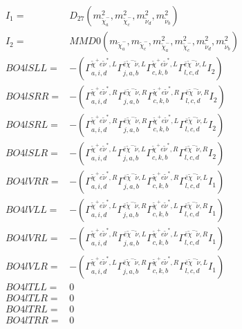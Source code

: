 \documentclass[A4,landscape]{article}
\begin{document}
\begin{align} 
I_1 = & D_{27}(m^2_{\tilde{\chi}^-_{{a}}}, m^2_{\tilde{\chi}^-_{{c}}}, m^2_{\tilde{\nu}_{{d}}}, m^2_{\tilde{\nu}_{{b}}}) \\ 
I_2 = & MMD0(m_{\tilde{\chi}^-_{{a}}}, m_{\tilde{\chi}^-_{{c}}}, m^2_{\tilde{\chi}^-_{{a}}}, m^2_{\tilde{\chi}^-_{{c}}}, m^2_{\tilde{\nu}_{{d}}}, m^2_{\tilde{\nu}_{{b}}}) \\ 
  BO4lSLL= & -( \Gamma^{\tilde{\chi}^+e \tilde{\nu}^*,L}_{a, i, d} \Gamma^{\bar{e}\tilde{\chi}^- \tilde{\nu} ,L}_{j, a, b} \Gamma^{\tilde{\chi}^+e \tilde{\nu}^*,L}_{c, k, b} \Gamma^{\bar{e}\tilde{\chi}^- \tilde{\nu} ,L}_{l, c, d} I_2) \\ 
  BO4lSRR= & -( \Gamma^{\tilde{\chi}^+e \tilde{\nu}^*,R}_{a, i, d} \Gamma^{\bar{e}\tilde{\chi}^- \tilde{\nu} ,R}_{j, a, b} \Gamma^{\tilde{\chi}^+e \tilde{\nu}^*,R}_{c, k, b} \Gamma^{\bar{e}\tilde{\chi}^- \tilde{\nu} ,R}_{l, c, d} I_2) \\ 
  BO4lSRL= & -( \Gamma^{\tilde{\chi}^+e \tilde{\nu}^*,R}_{a, i, d} \Gamma^{\bar{e}\tilde{\chi}^- \tilde{\nu} ,R}_{j, a, b} \Gamma^{\tilde{\chi}^+e \tilde{\nu}^*,L}_{c, k, b} \Gamma^{\bar{e}\tilde{\chi}^- \tilde{\nu} ,L}_{l, c, d} I_2) \\ 
  BO4lSLR= & -( \Gamma^{\tilde{\chi}^+e \tilde{\nu}^*,L}_{a, i, d} \Gamma^{\bar{e}\tilde{\chi}^- \tilde{\nu} ,L}_{j, a, b} \Gamma^{\tilde{\chi}^+e \tilde{\nu}^*,R}_{c, k, b} \Gamma^{\bar{e}\tilde{\chi}^- \tilde{\nu} ,R}_{l, c, d} I_2) \\ 
  BO4lVRR= & -( \Gamma^{\tilde{\chi}^+e \tilde{\nu}^*,R}_{a, i, d} \Gamma^{\bar{e}\tilde{\chi}^- \tilde{\nu} ,L}_{j, a, b} \Gamma^{\tilde{\chi}^+e \tilde{\nu}^*,R}_{c, k, b} \Gamma^{\bar{e}\tilde{\chi}^- \tilde{\nu} ,L}_{l, c, d} I_1) \\ 
  BO4lVLL= & -( \Gamma^{\tilde{\chi}^+e \tilde{\nu}^*,L}_{a, i, d} \Gamma^{\bar{e}\tilde{\chi}^- \tilde{\nu} ,R}_{j, a, b} \Gamma^{\tilde{\chi}^+e \tilde{\nu}^*,L}_{c, k, b} \Gamma^{\bar{e}\tilde{\chi}^- \tilde{\nu} ,R}_{l, c, d} I_1) \\ 
  BO4lVRL= & -( \Gamma^{\tilde{\chi}^+e \tilde{\nu}^*,R}_{a, i, d} \Gamma^{\bar{e}\tilde{\chi}^- \tilde{\nu} ,L}_{j, a, b} \Gamma^{\tilde{\chi}^+e \tilde{\nu}^*,L}_{c, k, b} \Gamma^{\bar{e}\tilde{\chi}^- \tilde{\nu} ,R}_{l, c, d} I_1) \\ 
  BO4lVLR= & -( \Gamma^{\tilde{\chi}^+e \tilde{\nu}^*,L}_{a, i, d} \Gamma^{\bar{e}\tilde{\chi}^- \tilde{\nu} ,R}_{j, a, b} \Gamma^{\tilde{\chi}^+e \tilde{\nu}^*,R}_{c, k, b} \Gamma^{\bar{e}\tilde{\chi}^- \tilde{\nu} ,L}_{l, c, d} I_1) \\ 
  BO4lTLL= & 0 \\ 
  BO4lTLR= & 0 \\ 
  BO4lTRL= & 0 \\ 
  BO4lTRR= & 0 \\ 
\end{align} 
\end{document}
